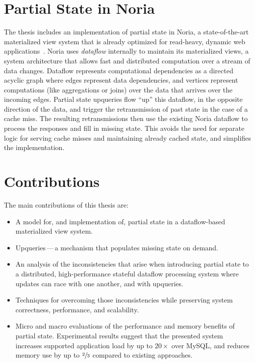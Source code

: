 \section{Partial State in Noria}
\label{s:intro:noria}

The thesis includes an implementation of partial state in Noria, a
state-of-the-art materialized view system that is already optimized for
read-heavy, dynamic web applications~\cite{noria}. Noria uses \textit{dataflow}
internally to maintain its materialized views, a system architecture that allows
fast and distributed computation over a stream of data changes. Dataflow
represents computational dependencies as a directed acyclic graph where edges
represent data dependencies, and vertices represent computations (like
aggregations or joins) over the data that arrives over the incoming edges.
Partial state upqueries flow ``up'' this dataflow, in the opposite direction of
the data, and trigger the retransmission of past state in the case of a cache
miss. The resulting retransmissions then use the existing Noria dataflow to
process the responses and fill in missing state. This avoids the need for
separate logic for serving cache misses and maintaining already cached state,
and simplifies the implementation.

\section{Contributions}
\label{s:contrib}

The main contributions of this thesis are:

\begin{itemize}
 \item A model for, and implementation of, partial state in a dataflow-based
   materialized view system.
 \item Upqueries\,---\,a mechanism that populates missing state on demand.
 \item An analysis of the inconsistencies that arise when introducing partial
   state to a distributed, high-performance stateful dataflow processing system
    where updates can race with one another, and with upqueries.
 \item Techniques for overcoming those inconsistencies while preserving system
   correctness, performance, and scalability.
 \item Micro and macro evaluations of the performance and memory benefits of
   partial state. Experimental results suggest that the presented system
    increases supported application load by up to $20\times$ over MySQL, and
    reduces memory use by up to $\sfrac{2}{3}$ compared to existing approaches.
\end{itemize}

